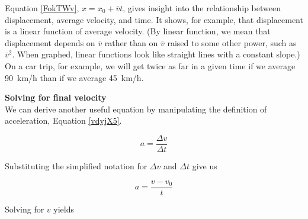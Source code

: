 \documentclass[dvipsnames]{article}
\begin{document}
Equation \eqref{FokTWv}, $x = x_0 + \bar{v} t$, gives insight into the relationship between displacement, average velocity, and time. It shows, for example, that displacement is a linear function of average velocity. (By linear function, we mean that displacement depends on $\bar{v}$ rather than on $\bar{v}$ raised to some other power, such as $\bar{v}^2$. When graphed, linear functions look like straight lines with a constant slope.) On a car trip, for example, we will get twice as far in a given time if we average \SI{90}{km/h} than if we average \SI{45}{km/h}.


\begin{center}
\captionsetup{type=figure,margin=1in,font=scriptsize}
\end{center}

\cyanhrule

\vspace{1ex}

\textbf{Solving for final velocity}\\
We can derive another useful equation by manipulating the definition of acceleration, Equation \eqref{vdyjX5}.

\begin{equation*}
    a = \frac{\Delta v}{\Delta t}
\end{equation*}

Substituting the simplified notation for $\Delta v$ and $\Delta t$ give us

\begin{equation*}
    a = \frac{v - v_0}{t}
\end{equation*}

Solving for $v$ yields
\end{document}
